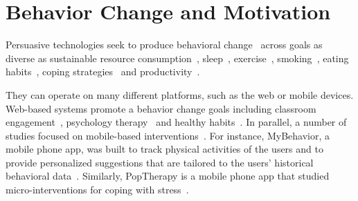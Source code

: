 \section{Behavior Change and Motivation}



Persuasive technologies seek to produce behavioral change~\cite{fogg2002persuasive} across goals as diverse as sustainable resource consumption~\cite{froehlich2009ubigreen}, sleep~\cite{kay2012lullaby,choe2011opportunities}, exercise~\cite{consolvo2008activity}, smoking~\cite{paay2015personal}, eating habits~\cite{noronha2011platemate,epstein2016crumbs}, coping strategies~\cite{adams2014towards,sanches2010mind} and productivity~\cite{whittaker2016don, kim2016timeaware,habitlab}.

They can operate on many different platforms, such as the web or mobile devices. Web-based systems promote a behavior change goals including classroom engagement~\cite{anderson2014engaging, anderson2013steering}, psychology therapy~\cite{doi:10.1080/15228830802094429} and healthy habits~\cite{cugelman2013gamification, lyons2014behavior}. In parallel, a number of studies focused on mobile-based interventions~\cite{paredes2014poptherapy, RILEY201567, FJELDSOE2009165, Whittaker09, info:doi/10.2196/mhealth.4160}. For instance, MyBehavior, a mobile phone app, was built to track physical activities of the users and to provide personalized suggestions that are tailored to the users' historical behavioral data~\cite{info:doi/10.2196/mhealth.4160}. Similarly, PopTherapy is a mobile phone app that studied micro-interventions for coping with stress~\cite{paredes2014poptherapy}.

